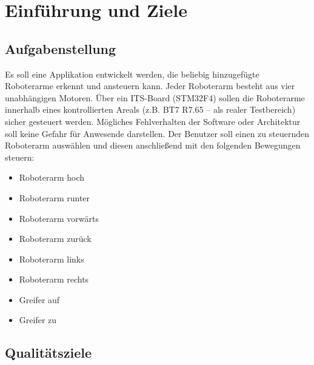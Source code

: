 \chapter{Einführung und Ziele}

\section{Aufgabenstellung}

Es soll eine Applikation entwickelt werden, die beliebig hinzugefügte Roboterarme erkennt und ansteuern kann.
Jeder Roboterarm besteht aus vier unabhängigen Motoren. Über ein ITS-Board (STM32F4) sollen die Roboterarme innerhalb eines kontrollierten Areals (z.B. BT7 R7.65 – als realer Testbereich) sicher gesteuert werden.
Mögliches Fehlverhalten der Software oder Architektur soll keine Gefahr für Anwesende darstellen. Der Benutzer soll einen zu steuernden Roboterarm auswählen und diesen anschließend mit den folgenden Bewegungen steuern:

\begin{itemize}
	\item Roboterarm hoch
	\item Roboterarm runter
	\item Roboterarm vorwärts
	\item Roboterarm zurück
	\item Roboterarm links
	\item Roboterarm rechts
	\item Greifer auf
	\item Greifer zu
	
\end{itemize}


\newpage
\section{Qualitätsziele}

